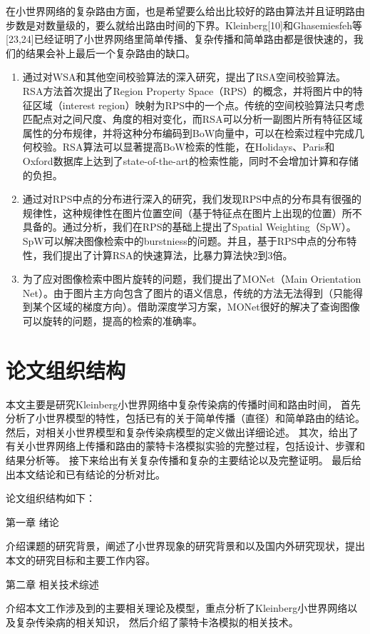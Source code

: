 在小世界网络的复杂路由方面，也是希望要么给出比较好的路由算法并且证明路由步数是对数量级的，要么就给出路由时间的下界。Kleinberg[10]和Ghasemiesfeh等[23,24]已经证明了小世界网络里简单传播、复杂传播和简单路由都是很快速的，我们的结果会补上最后一个复杂路由的缺口。


\begin{enumerate}
\item  通过对WSA和其他空间校验算法的深入研究，提出了RSA空间校验算法。RSA方法首次提出了Region Property Space（RPS）的概念，并将图片中的特征区域（interest region）映射为RPS中的一个点。传统的空间校验算法只考虑匹配点对之间尺度、角度的相对变化，而RSA可以分析一副图片所有特征区域属性的分布规律，并将这种分布编码到BoW向量中，可以在检索过程中完成几何校验。RSA算法可以显著提高BoW检索的性能，在Holidays、Paris和Oxford数据库上达到了state-of-the-art的检索性能，同时不会增加计算和存储的负担。
\item  通过对RPS中点的分布进行深入的研究，我们发现RPS中点的分布具有很强的规律性，这种规律性在图片位置空间（基于特征点在图片上出现的位置）所不具备的。通过分析，我们在RPS的基础上提出了Spatial Weighting（SpW）。SpW可以解决图像检索中的burstniess\cite{jegou2009burstiness}的问题。并且，基于RPS中点的分布特性，我们提出了计算RSA的快速算法，比暴力算法快2到3倍。
\item 为了应对图像检索中图片旋转的问题，我们提出了MONet（Main Orientation Net）。由于图片主方向包含了图片的语义信息，传统的方法无法得到（只能得到某个区域的梯度方向）。借助深度学习方案，MONet很好的解决了查询图像可以旋转的问题，提高的检索的准确率。
\end{enumerate}

\section{论文组织结构}
本文主要是研究Kleinberg小世界网络中复杂传染病的传播时间和路由时间，
首先分析了小世界模型的特性，包括已有的关于简单传播（直径）和简单路由的结论。
然后，对相关小世界模型和复杂传染病模型的定义做出详细论述。
其次，给出了有关小世界网络上传播和路由的蒙特卡洛模拟实验的完整过程，包括设计、步骤和结果分析等。
接下来给出有关复杂传播和复杂的主要结论以及完整证明。
最后给出本文结论和已有结论的分析对比。

论文组织结构如下：

第一章 绪论

介绍课题的研究背景，阐述了小世界现象的研究背景和以及国内外研究现状，提出本文的研究目标和主要工作内容。

第二章 相关技术综述

介绍本文工作涉及到的主要相关理论及模型，重点分析了Kleinberg小世界网络以及复杂传染病的相关知识，
然后介绍了蒙特卡洛模拟的相关技术。

